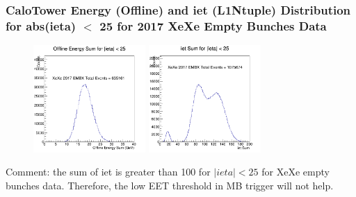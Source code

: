 \documentclass{beamer}
\begin{document}
\begin{frame}
\frametitle{CaloTower Energy (Offline) and iet (L1Ntuple) Distribution for abs(ieta) $<$ 25 for 2017 XeXe Empty Bunches Data}

\begin{figure}
\includegraphics[width=0.38\textwidth]{Plots/XeXe/EnergySumHis25.png}
\includegraphics[width=0.38\textwidth]{Plots/XeXe/iETSumHisLT25.png}
\end{figure}


\begin{block}
{Comment: the sum of iet is greater than 100 for $|ieta| < 25$ for XeXe empty bunches data. Therefore, the low EET threshold in MB trigger will not help.}
\end{block}
\end{frame}
\end{document}
